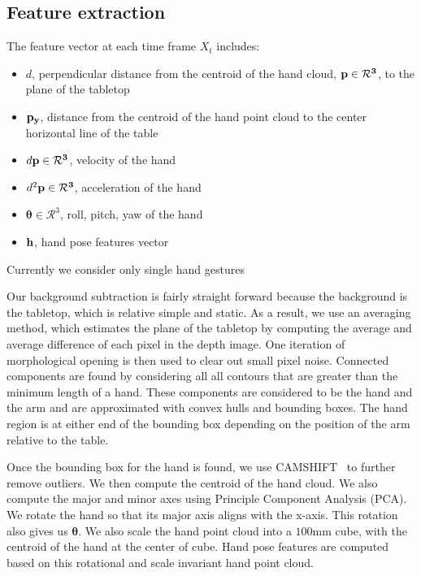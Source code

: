 \documentclass[10pt,twocolumn,letterpaper]{article}
\begin{document}
\subsection{Feature extraction}
The feature vector at each time frame $X_t$ includes: 
\begin{itemize}
  \item $d$, perpendicular distance from the centroid of the hand cloud, $\bf{p}\in\mathcal{R}^3$, to the plane of the tabletop 
  \item $\bf{p}_y$, distance from the centroid of the hand point cloud to the center horizontal line of the table
  \item $d\bf{p}\in\mathcal{R}^3$, velocity of the hand
  \item $d^2\bf{p}\in\mathcal{R}^3$, acceleration of the hand
  \item $\boldsymbol{\theta}\in\mathcal{R}^3$, roll, pitch, yaw of the hand
  \item $\bf{h}$, hand pose features vector 
\end{itemize}
Currently we consider only single hand gestures

Our background subtraction is fairly straight forward because the background is the tabletop, which is relative simple and static. As a
result, we use an averaging method, which estimates the plane of the tabletop by computing the average and average difference of each pixel in the depth image.
One iteration of morphological opening is then used to clear out small pixel noise. 
Connected components are found by considering all all contours that are greater than the minimum
length of a hand.
These components are considered to be the hand and the arm and are approximated with convex hulls and bounding boxes. 
The hand region is at either end of the bounding box depending on the position of the arm relative to the table.

Once the bounding box for the hand is found, we use CAMSHIFT~\cite{Bradski98}
to further remove outliers. We then compute the centroid of the hand cloud. We also compute
the major and minor axes using Principle Component Analysis (PCA). We rotate the hand
so that its major axis aligns with the x-axis. This rotation also gives us $\boldsymbol{\theta}$.
We also scale the hand point cloud into a $100$mm cube, with the centroid of the hand 
at the center of cube. Hand pose features are computed
based on this rotational and scale invariant hand point cloud.
\end{document}
